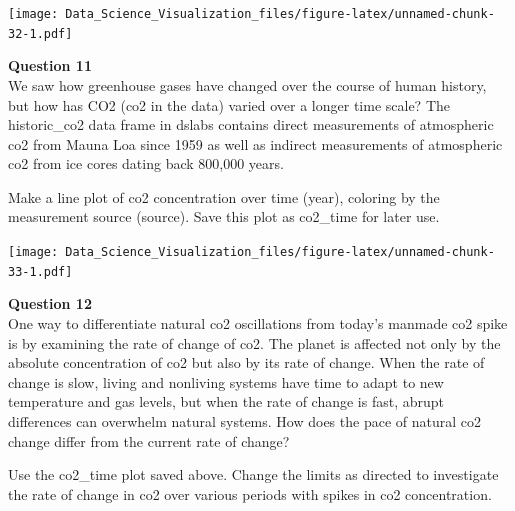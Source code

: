 \documentclass[
]{article}
\newenvironment{Shaded}{\begin{snugshade}}{\end{snugshade}}
\newcommand{\DataTypeTok}[1]{\textcolor[rgb]{0.13,0.29,0.53}{#1}}
\newcommand{\KeywordTok}[1]{\textcolor[rgb]{0.13,0.29,0.53}{\textbf{#1}}}
\newcommand{\NormalTok}[1]{#1}
\newcommand{\OperatorTok}[1]{\textcolor[rgb]{0.81,0.36,0.00}{\textbf{#1}}}
\newcommand{\StringTok}[1]{\textcolor[rgb]{0.31,0.60,0.02}{#1}}
\begin{document}
\begin{Shaded}
\end{Shaded}

\texttt{[image: Data\_Science\_Visualization\_files/figure-latex/unnamed-chunk-32-1.pdf]}

\textbf{Question 11}\\
We saw how greenhouse gases have changed over the course of human
history, but how has CO2 (co2 in the data) varied over a longer time
scale? The historic\_co2 data frame in dslabs contains direct
measurements of atmospheric co2 from Mauna Loa since 1959 as well as
indirect measurements of atmospheric co2 from ice cores dating back
800,000 years.

Make a line plot of co2 concentration over time (year), coloring by the
measurement source (source). Save this plot as co2\_time for later use.

\begin{Shaded}
\end{Shaded}

\texttt{[image: Data\_Science\_Visualization\_files/figure-latex/unnamed-chunk-33-1.pdf]}

\textbf{Question 12}\\
One way to differentiate natural co2 oscillations from today's manmade
co2 spike is by examining the rate of change of co2. The planet is
affected not only by the absolute concentration of co2 but also by its
rate of change. When the rate of change is slow, living and nonliving
systems have time to adapt to new temperature and gas levels, but when
the rate of change is fast, abrupt differences can overwhelm natural
systems. How does the pace of natural co2 change differ from the current
rate of change?

Use the co2\_time plot saved above. Change the limits as directed to
investigate the rate of change in co2 over various periods with spikes
in co2 concentration.
\end{document}
